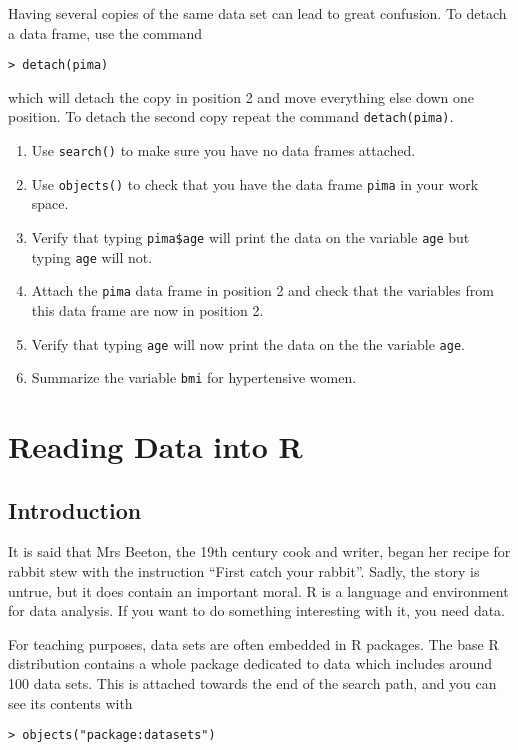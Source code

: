 \documentclass[12pt]{article}
\begin{document}
Having several copies of the same data set can lead to great confusion. To detach a data frame, use the command

\begin{verbatim}
> detach(pima)
\end{verbatim}

which will detach the copy in position 2 and move everything else down one position. To detach the second copy repeat the command \texttt{detach(pima)}.

\begin{enumerate}
\item  Use \texttt{search()} to make sure you have no data frames attached.
\item  Use \texttt{objects()} to check that you have the data frame \texttt{pima} in your work space.
\item  Verify that typing \texttt{pima\$age} will print the data on the variable \texttt{age} but typing \texttt{age} will not.
\item Attach the \texttt{pima} data frame in position 2 and check that the variables from this data frame are now in position 2.
\item Verify that typing \texttt{age} will now print the data on the the variable \texttt{age}.
\item Summarize the variable \texttt{bmi} for hypertensive women.
\end{enumerate}

\section{Reading Data into R}
\subsection{Introduction}
It is said that Mrs Beeton, the 19th century cook and writer, began her recipe for rabbit stew with the instruction “First catch your rabbit”. Sadly, the story is untrue, but it does contain an
important moral. R is a language and environment for data analysis. If you want to do something
interesting with it, you need data.

For teaching purposes, data sets are often embedded in R packages. The base R distribution contains a whole package dedicated to data which includes around 100 data sets. This is attached
towards the end of the search path, and you can see its contents with

\begin{verbatim}
> objects("package:datasets")
\end{verbatim}
\end{document}
